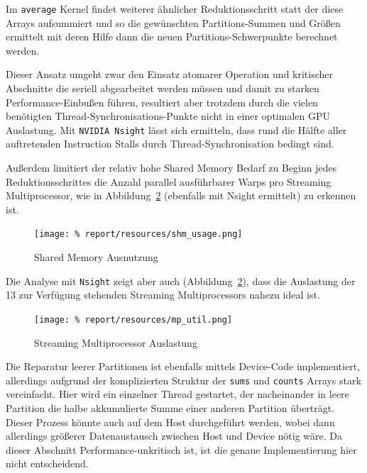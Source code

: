 \documentclass[
    bibliography=totoc, cd=lightcolor, cdmath=false, ngerman]{tudscrreprt}
\begin{document}
\vspace{20pt}

Im \texttt{average} Kernel findet weiterer ähnlicher Reduktionsschritt statt
der diese Arrays aufsummiert und so die gewünschten Partitions-Summen und
Größen ermittelt mit deren Hilfe dann die neuen Partitions-Schwerpunkte
berechnet werden.

Dieser Ansatz umgeht zwar den Einsatz atomarer Operation und kritischer
Abschnitte die seriell abgearbeitet werden müssen und damit zu starken
Performance-Einbußen führen, resultiert aber trotzdem durch die vielen
benötigten Thread-Synchronisations-Punkte nicht in einer optimalen GPU
Auslastung. Mit \texttt{NVIDIA Nsight} lässt sich ermitteln, dass rund die
Hälfte aller auftretenden Instruction Stalls durch Thread-Synchronisation
bedingt sind.

Außerdem limitiert der relativ hohe Shared Memory Bedarf zu Beginn
jedes Reduktionsschrittes die Anzahl parallel ausführbarer Warps pro Streaming
Multiprocessor, wie in Abbildung~\ref{fig:shm} (ebenfalls mit Nsight ermittelt)
zu erkennen ist.

\begin{figure}[htbp]
  \begin{center}
    \texttt{[image: \%
    report/resources/shm\_usage.png]}
  \end{center}
  \caption{Shared Memory Ausnutzung}
  \label{fig:shm}
\end{figure}

Die Analyse mit \texttt{Nsight} zeigt aber auch (Abbildung~\ref{fig:shm}), dass
die Auslastung der 13 zur Verfügung stehenden Streaming Multiprocessors
nahezu ideal ist.

\begin{figure}[htbp]
  \begin{center}
    \texttt{[image: \%
    report/resources/mp\_util.png]}
  \end{center}
  \caption{Streaming Multiprocessor Auslastung}
  \label{fig:shm}
\end{figure}

Die Reparatur leerer Partitionen ist ebenfalls mittels Device-Code
implementiert, allerdings aufgrund der komplizierten Struktur der \texttt{sums}
und \texttt{counts} Arrays stark vereinfacht. Hier wird ein einzelner Thread
gestartet, der nacheinander in leere Partition die halbe akkumulierte Summe
einer anderen Partition überträgt. Dieser Prozess könnte auch auf dem Host
durchgeführt werden, wobei dann allerdings größerer Datenaustausch zwischen
Host und Device nötig wäre. Da dieser Abschnitt Performance-unkritisch ist, ist
die genaue Implementierung hier nicht entscheidend.
\end{document}
